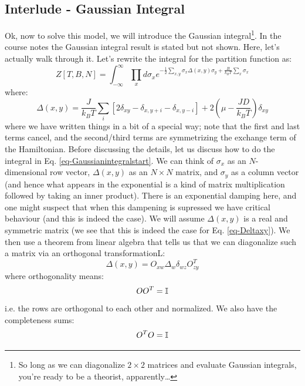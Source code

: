 \subsection{Interlude - Gaussian Integral}
Ok, now to solve this model, we will introduce the Gaussian integral\footnote{So long as we can diagonalize $2 \times 2$ matrices and evaluate Gaussian integrals, you're ready to be a theorist, apparently\ldots}. In the course notes the Gaussian integral result is stated but not shown. Here, let's actually walk through it. Let's rewrite the integral for the partition function as:
\begin{equation}\label{eq-Gaussianintegralstart}
    Z[T, B, N]  = \int_{-\infty}^\infty \prod_x d\sigma_x e^{-\frac{1}{2}\sum_{x, y}\sigma_x \Delta(x, y)\sigma_y + \frac{B}{k_B T}\sum_x \sigma_x}
\end{equation}
where:
\begin{equation}\label{eq-Deltaxyspherical}
    \Delta(x, y) = \frac{J}{k_B T}\sum_i\left[2\delta_{xy} - \delta_{x, y+i} - \delta_{x, y - i}\right] + 2\left(\mu - \frac{JD}{k_B T}\right)\delta_{xy}
\end{equation}
where we have written things in a bit of a special way; note that the first and last terms cancel, and the second/third terms are symmetrizing the exchange term of the Hamiltonian. Before discussing the details, let us discuss how to do the integral in Eq. \eqref{eq-Gaussianintegralstart}. We can think of $\sigma_x$ as an $N$-dimensional row vector, $\Delta(x, y)$ as an $N \times N$ matrix, and $\sigma_y$ as a column vector (and hence what appears in the exponential is a kind of matrix multiplication followed by taking an inner product). There is an exponential damping here, and one might suspect that when this dampening is supressed we have critical behaviour (and this is indeed the case). We will assume $\Delta(x, y)$ is a real and symmetric matrix (we see that this is indeed the case for Eq. \eqref{eq-Deltaxy}). We then use a theorem from linear algebra that tells us that we can diagonalize such a matrix via an orthogonal transformationL:
\begin{equation}
    \Delta(x, y) = O_{x w}\Delta_{w}\delta_{wz}O_{zy}^T
\end{equation}
where orthogonality means:
\begin{equation}
    OO^T = \mathbb{I}
\end{equation}
i.e. the rows are orthogonal to each other and normalized. We also have the completeness sums:
\begin{equation}
    O^T O = \mathbb{I}
\end{equation}
